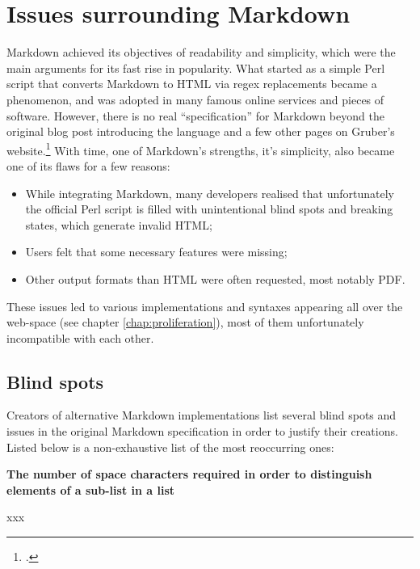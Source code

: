 \chapter{Issues surrounding Markdown}
\label{chap:issues}

\vspace{1cm}

Markdown achieved its objectives of readability and simplicity, which were the main arguments for its fast rise in popularity.
What started as a simple Perl script that converts Markdown to HTML via regex replacements became a phenomenon, and was adopted in many
famous online services and pieces of software. However, there is no real ``specification'' for Markdown beyond the original blog post
introducing the language and a few other pages on Gruber's website.\footcite{gruber2004markdown}
With time, one of Markdown's strengths, it's simplicity, also became one of its flaws for a few reasons:

\begin{itemize}
    \item While integrating Markdown, many developers realised that unfortunately the official Perl script is filled with unintentional
    blind spots and breaking states, which generate invalid HTML;
    \item Users felt that some necessary features were missing;
    \item Other output formats than HTML were often requested, most notably PDF.
\end{itemize}

These issues led to various implementations and syntaxes appearing all over the web-space (see chapter \ref{chap:proliferation}),
most of them unfortunately incompatible with each other.

\section{Blind spots}

Creators of alternative Markdown implementations list several blind spots and issues in the original Markdown specification in order to
justify their creations. Listed below is a non-exhaustive list of the most reoccurring ones:\newline

\textbf{The number of space characters required in order to distinguish elements of a sub-list in a list}\newline

xxx\newline

